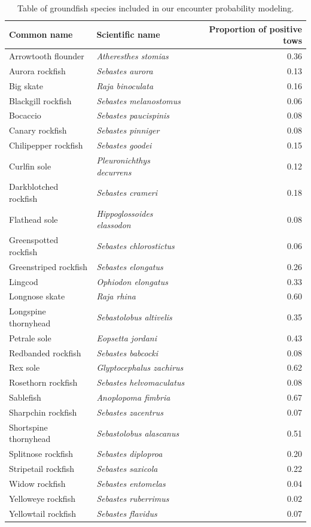 \documentclass[11pt]{article}
\begin{document}
\begin{table}
\caption{\label{tab:gf} Table of groundfish species included in our encounter probability modeling.}
\centering
\begin{tabular}[t]{llr}
\toprule
Common name & Scientific name & Proportion of positive tows\\
\midrule
Arrowtooth flounder & \textit{Atheresthes stomias} & 0.36\\
Aurora rockfish & \textit{Sebastes aurora} & 0.13\\
Big skate & \textit{Raja binoculata} & 0.16\\
Blackgill rockfish & \textit{Sebastes melanostomus} & 0.06\\
Bocaccio & \textit{Sebastes paucispinis} & 0.08\\
Canary rockfish & \textit{Sebastes pinniger} & 0.08\\
Chilipepper rockfish & \textit{Sebastes goodei} & 0.15\\
Curlfin sole & \textit{Pleuronichthys decurrens} & 0.12\\
Darkblotched rockfish & \textit{Sebastes crameri} & 0.18\\
Flathead sole & \textit{Hippoglossoides elassodon} & 0.08\\
Greenspotted rockfish & \textit{Sebastes chlorostictus} & 0.06\\
Greenstriped rockfish & \textit{Sebastes elongatus} & 0.26\\
Lingcod & \textit{Ophiodon elongatus} & 0.33\\
Longnose skate & \textit{Raja rhina} & 0.60\\
Longspine thornyhead & \textit{Sebastolobus altivelis} & 0.35\\
Petrale sole & \textit{Eopsetta jordani} & 0.43\\
Redbanded rockfish & \textit{Sebastes babcocki} & 0.08\\
Rex sole & \textit{Glyptocephalus zachirus} & 0.62\\
Rosethorn rockfish & \textit{Sebastes helvomaculatus} & 0.08\\
Sablefish & \textit{Anoplopoma fimbria} & 0.67\\
Sharpchin rockfish & \textit{Sebastes zacentrus} & 0.07\\
Shortspine thornyhead & \textit{Sebastolobus alascanus} & 0.51\\
Splitnose rockfish & \textit{Sebastes diploproa} & 0.20\\
Stripetail rockfish & \textit{Sebastes saxicola} & 0.22\\
Widow rockfish & \textit{Sebastes entomelas} & 0.04\\
Yelloweye rockfish & \textit{Sebastes ruberrimus} & 0.02\\
Yellowtail rockfish & \textit{Sebastes flavidus} & 0.07\\
\bottomrule
\end{tabular}
\end{table}

\break
\end{document}
